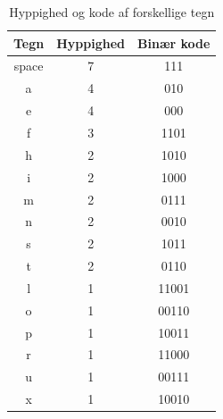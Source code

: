 \begin{table}
\begin{tabular}{|c|c|c|}
\hline
Tegn & Hyppighed & Binær kode \\
\hline \hline
space & 7 & 111 \\ 
\hline 
a & 4 & 010 \\ 
\hline 
e & 4 & 000 \\ 
\hline 
f & 3 & 1101 \\ 
\hline 
h & 2 & 1010 \\ 
\hline 
i & 2 & 1000 \\ 
\hline 
m & 2 & 0111 \\ 
\hline 
n & 2 & 0010 \\ 
\hline 
s & 2 & 1011 \\ 
\hline 
t & 2 & 0110 \\ 
\hline 
l & 1 & 11001 \\ 
\hline 
o & 1 & 00110 \\ 
\hline 
p & 1 & 10011 \\ 
\hline 
r & 1 & 11000 \\ 
\hline 
u & 1 & 00111 \\ 
\hline 
x & 1 & 10010 \\ 
\hline 
\end{tabular}
\caption{Hyppighed og kode af forskellige tegn}
\label{tab:huffmantable}
\end{table}